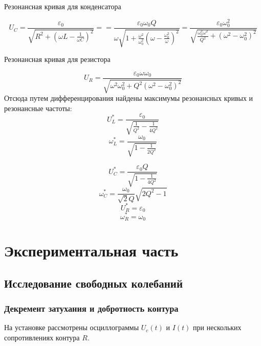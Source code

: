 \begin{center}
Резонансная кривая для конденсатора
\end{center}

\begin{equation}
	U_C=\frac{\varepsilon_0}{\sqrt{R^2+(\omega L-\frac{1}{\omega C})^2}}=
		=\frac{\varepsilon_0\omega_0 Q}
			{\omega \sqrt{1+\frac{\omega^2}{\omega_0^2}(\omega-\frac{\omega_0^2}{\omega})^2}}
		=\frac{\varepsilon_0\omega_0^2}{\sqrt{\frac{\omega_0^2\omega^2}{Q^2}+(\omega^2-\omega_0^2)^2}}
\end{equation}

\begin{center}
Резонансная кривая для резистора
\end{center}
\begin{equation}
	U_R=\frac{\varepsilon_0\omega\omega_0}{\sqrt{\omega^2\omega_0^2+Q^2(\omega^2-\omega_0^2)^2}}
\end{equation}
Отсюда путем дифференцирования найдены максимумы резонансных  кривых и резонансные частоты:
\begin{equation}
	U_L^*=\frac{\varepsilon_0}{\sqrt{\frac{1}{Q^2}-\frac{1}{4Q^2}}}
\end{equation}
\begin{equation}
	\omega^*_L=\frac{\omega_0}{\sqrt{1-\frac{1}{2Q^2}}}
\end{equation}

\begin{equation}
	U_C^*=\frac{\varepsilon_0 Q}{\sqrt{1-\frac{1}{4Q^2}}}
\end{equation}
\begin{equation}
	\omega^*_C=\frac{\omega_0}{\sqrt{2}Q}\sqrt{2Q^2-1}
\end{equation}
\begin{equation}
		U_R^*=\varepsilon_0
\end{equation}	
\begin{equation}
		\omega_R^*=\omega_0
\end{equation}
\newpage

\section{Экспериментальная часть}
\subsection{Исследование свободных колебаний}
\subsubsection{Декремент затухания и добротность контура}
На установке рассмотрены осциллограммы $U_c(t)$ и $I(t)$ при нескольких сопротивлениях контура $R$. 

